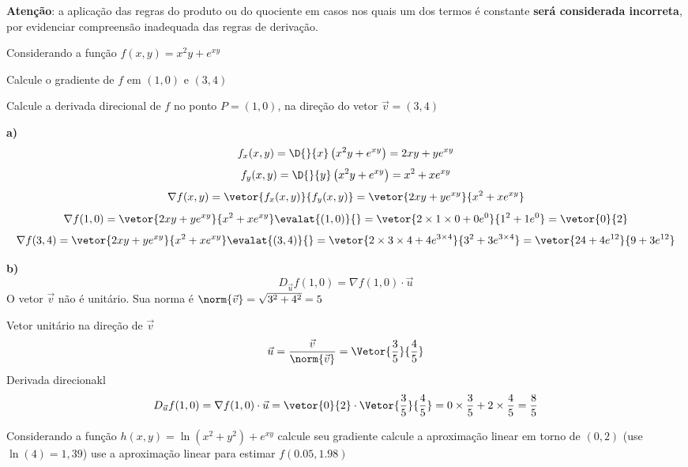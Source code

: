 \documentclass[a4paper,12pt,fleqn]{article}
\begin{document}

\bigskip
\textbf{Atenção}: a aplicação das regras do produto ou do quociente em casos
nos quais um dos termos é constante \textbf{será considerada incorreta},
por evidenciar compreensão inadequada das regras de derivação.

Considerando a função
\(
  f(x, y) = x^2y + e^{xy}
\)

  Calcule o gradiente de $f$ em $(1, 0)$ e $(3, 4)$

  Calcule a derivada direcional de $f$ no ponto
  $P=(1, 0)$, na direção do vetor $\vec{v}=(3, 4)$

\begin{answer}
\textbf{a)}
\vspace{-\baselineskip}
  \[
    f_x(x, y)
    = \D{}{x}\left(x^2y + e^{xy}\right)
    = 2xy + ye^{xy}
  \]
  \[
    f_y(x, y)
    = \D{}{y}\left(x^2y + e^{xy}\right)
    = x^2 + xe^{xy}
  \]
  \[
    \nabla f(x, y)
    = \vetor{f_x(x, y)}{f_y(x, y)}
    = \vetor{2xy + ye^{xy}}{x^2 + xe^{xy}}
  \]
  \[
    \nabla f(1, 0)
    = \vetor{2xy + ye^{xy}}{x^2 + xe^{xy}} \evalat{(1, 0)}{}
    = \vetor{2 \times 1 \times 0 + 0e^0}{1^2+1e^0}
    = \vetor{0}{2}
  \]
  \[
    \nabla f(3, 4)
    = \vetor{2xy + ye^{xy}}{x^2 + xe^{xy}} \evalat{(3, 4)}{}
    = \vetor{2 \times 3 \times 4 + 4e^{3\times 4}}
            {3^2 + 3e^{3 \times 4}}
    = \vetor{24+4e^{12}}{9+3e^{12}}
  \]

\bigskip
\textbf{b)}
\vspace{-\baselineskip}
  \[
    D_{\vec{u}}f(1, 0) = \nabla f(1, 0) \cdot \vec{u}
  \]
  O vetor $\vec{v}$ não é unitário. Sua norma é
  \(
    \norm{\vec{v}}
    = \sqrt{3^2 + 4^2}
    = 5
  \)

  Vetor unitário na direção de $\vec{v}$
  \[
    \vec{u}
    = \frac{\vec{v}}{\norm{\vec{v}}}
    = \Vetor{\frac{3}{5}}{\frac{4}{5}}
  \]
  Derivada direcionakl
  \[
    D_{\vec{u}}f(1, 0)
    = \nabla f(1, 0) \cdot \vec{u}
    = \vetor{0}{2} \cdot \Vetor{\frac{3}{5}}{\frac{4}{5}}
    = 0 \times \frac{3}{5} + 2  \times  \frac{4}{5}
    = \frac{8}{5}
  \]
\end{answer}

\clearpagequestiononly
{}
Considerando a função
\(
  h(x, y) = \ln\left(x^2+y^2\right) + e^{xy}
\)
 calcule seu gradiente
 calcule a aproximação linear em torno de \((0, 2)\)
                    (use $\ln(4) = 1,39$)
 use a aproximação linear para estimar \(f(0.05, 1.98)\)
\end{document}
